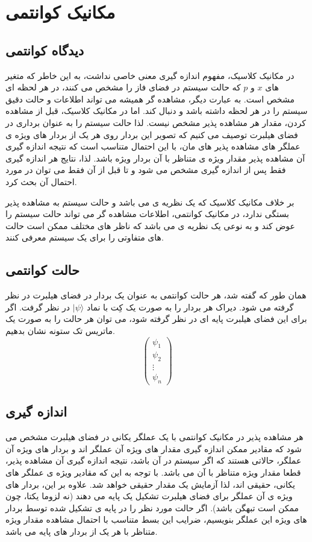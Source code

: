 \section{مکانیک کوانتمی}
\subsection{دیدگاه کوانتمی}
در مکانیک کلاسیک، مفهوم اندازه گیری معنی خاصی نداشت، به این خاطر که متغیر های 
$x$
و 
$p$
که حالت سیستم در فضای فاز را مشخص می کنند، در هر لحظه ای مشخص است. به عبارت دیگر، مشاهده گر همیشه می تواند اطلاعات و حالت دقیق سیستم را در هر لحظه داشته باشد و دنبال کند. اما در مکانیک کلاسیک، قبل از مشاهده کردن، مقدار هر مشاهده پذیر مشخص نیست. لذا حالت سیستم را به عنوان برداری در فضای هیلبرت توصیف می کنیم که تصویر این بردار روی هر یک از بردار های ویژه ی عملگر های مشاهده پذیر های مان، با  این احتمال متناسب است که نتیجه اندازه گیری آن مشاهده پذیر مقدار ویژه ی متناظر با آن بردار ویژه باشد. لذا، نتایج هر اندازه گیری فقط پس از اندازه گیری مشخص می شود و تا قبل از آن فقط می توان در مورد احتمال آن بحث کرد.

بر خلاف مکانیک کلاسیک که یک نظریه ی 
می باشد و حالت سیستم به مشاهده پذیر بستگی ندارد، در مکانیک کوانتمی، اطلاعات مشاهده گر می تواند حالت سیستم را عوض کند و به نوعی یک نظریه ی
می باشد که ناظر های مختلف ممکن است حالت های متفاوتی را برای یک سیستم معرفی کنند.
\subsection{حالت کوانتمی}
همان طور که گفته شد، هر حالت کوانتمی به عنوان یک بردار در فضای هیلبرت در نظر گرفته می شود. دیراک هر بردار را به صورت یک کِت با نماد
$| \psi \rangle $
در نظر گرفت. اگر برای این فضای هیلبرت پایه ای در نظر گرفته شود، می توان هر حالت را به صورت یک ماتریس تک ستونه نشان بدهیم.
\begin{equation*}
	\begin{pmatrix}
		\psi_1 \\ \psi_2 \\ \vdots \\ \psi_n
	\end{pmatrix}
\end{equation*}
\subsection{اندازه گیری}
هر مشاهده پذیر در مکانیک کوانتمی با یک عملگر  یکانی در فضای هیلبرت مشخص می شود که مقادیر ممکن اندازه گیری مقدار های  ویژه آن عملگر اند و  بردار های  ویژه آن عملگر، حالاتی هستند که اگر سیستم در آن باشد، نتیجه اندازه گیری آن مشاهده پذیر، قطعا  مقدار  ویژه متناظر با آن می باشد. با توجه به این که مقادیر ویژه ی عملگر های یکانی، حقیقی اند، لذا آزمایش یک مقدار حقیقی خواهد شد. علاوه بر این، بردار های ویژه ی آن عملگر برای فضای هیلبرت تشکیل یک پایه می دهند (نه لزوما یکتا، چون ممکن است تبهگن باشد). اگر حالت مورد نظر را در پایه ی تشکیل شده توسط بردار های  ویژه این عملگر بنویسیم، ضرایب این بسط متناسب با احتمال مشاهده  مقدار ویژه متناظر با هر یک از بردار های پایه می باشد.
